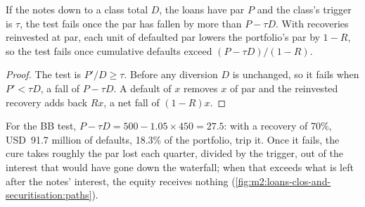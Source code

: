 \begin{proposition}\label{prop:m2:loans-clos-and-securitisation:cushion}
If the notes down to a class total $D$, the loans have par $P$ and the class's trigger
is $\tau$, the test fails once the par has fallen by more than $P - \tau D$. With
recoveries reinvested at par, each unit of defaulted par lowers the portfolio's par by
$1 - R$, so the test fails once cumulative defaults exceed $(P - \tau D)/(1 - R)$.
\end{proposition}

\begin{proof}
The test is $P'/D \geq \tau$. Before any diversion $D$ is unchanged, so it fails when
$P' < \tau D$, a fall of $P - \tau D$. A default of $x$ removes $x$ of par and the
reinvested recovery adds back $Rx$, a net fall of $(1-R)x$.
\end{proof}

For the BB test, $P - \tau D = 500 - 1.05 \times 450 = 27.5$: with a recovery of 70\%,
USD~91.7 million of defaults, 18.3\% of the portfolio, trip it. Once it fails, the cure
takes roughly the par lost each quarter, divided by the trigger, out of the interest
that would have gone down the waterfall; when that exceeds what is left after the notes'
interest, the equity receives nothing
(\cref{fig:m2:loans-clos-and-securitisation:paths}).

